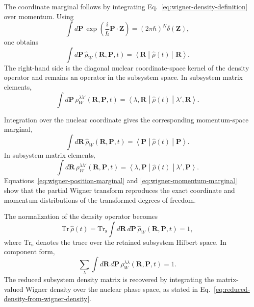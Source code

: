 \documentclass[
  11pt,
  letterpaper,
  onehalfspacing,
  normalmargins,
  equalmargins,
  oneside
]{ut-thesis}
\begin{document}
The coordinate marginal follows by integrating
Eq.~\eqref{eq:wigner-density-definition} over momentum. Using
\begin{equation}
\int d\mathbf P\,
\exp\left(
\frac{i}{\hbar}\mathbf P\cdot\mathbf Z
\right)
=
(2\pi\hbar)^N\delta(\mathbf Z),
\label{eq:wigner-fourier-delta}
\end{equation}
one obtains
\begin{equation}
\int d\mathbf P\,
\hat\rho_W(\mathbf R,\mathbf P,t)
=
\left\langle
\mathbf R
\middle|
\hat\rho(t)
\middle|
\mathbf R
\right\rangle .
\label{eq:wigner-position-marginal}
\end{equation}
The right-hand side is the diagonal nuclear coordinate-space kernel of the
density operator and remains an operator in the subsystem space. In subsystem
matrix elements,
\begin{equation}
\int d\mathbf P\,
\rho_W^{\lambda\lambda'}(\mathbf R,\mathbf P,t)
=
\left\langle
\lambda,\mathbf R
\middle|
\hat\rho(t)
\middle|
\lambda',\mathbf R
\right\rangle .
\label{eq:wigner-position-marginal-components}
\end{equation}

Integration over the nuclear coordinate gives the corresponding
momentum-space marginal,
\begin{equation}
\int d\mathbf R\,
\hat\rho_W(\mathbf R,\mathbf P,t)
=
\left\langle
\mathbf P
\middle|
\hat\rho(t)
\middle|
\mathbf P
\right\rangle .
\label{eq:wigner-momentum-marginal}
\end{equation}
In subsystem matrix elements,
\begin{equation}
\int d\mathbf R\,
\rho_W^{\lambda\lambda'}(\mathbf R,\mathbf P,t)
=
\left\langle
\lambda,\mathbf P
\middle|
\hat\rho(t)
\middle|
\lambda',\mathbf P
\right\rangle .
\label{eq:wigner-momentum-marginal-components}
\end{equation}
Equations~\eqref{eq:wigner-position-marginal} and
\eqref{eq:wigner-momentum-marginal} show that the partial Wigner transform
reproduces the exact coordinate and momentum distributions of the transformed
degrees of freedom.

The normalization of the density operator becomes
\begin{equation}
\mathrm{Tr}\,\hat\rho(t)
=
\mathrm{Tr}_{\mathrm s}
\int d\mathbf R\,d\mathbf P\,
\hat\rho_W(\mathbf R,\mathbf P,t)
=
1,
\label{eq:wigner-normalization}
\end{equation}
where \(\mathrm{Tr}_{\mathrm s}\) denotes the trace over the retained
subsystem Hilbert space. In component form,
\begin{equation}
\sum_{\lambda}
\int d\mathbf R\,d\mathbf P\,
\rho_W^{\lambda\lambda}(\mathbf R,\mathbf P,t)
=
1.
\label{eq:matrix-wigner-normalization}
\end{equation}
The reduced subsystem density matrix is recovered by integrating the
matrix-valued Wigner density over the nuclear phase space, as stated in
Eq.~\eqref{eq:reduced-density-from-wigner-density}.
\end{document}
